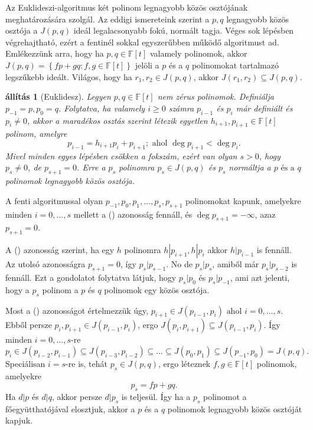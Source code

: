 \documentclass[9pt, showtrims]{memoir}
\makeatletter
\renewenvironment{proof}[1][\proofname]
    {\par\pushQED{\qed}%
    \normalfont \topsep6\p@\@plus6\p@\relax
    \trivlist
    \item[\hskip\labelsep
        \itshape
    #1\@addpunct{:}]\ignorespaces}
    {\popQED\endtrivlist\@endpefalse}
\theoremstyle{plain}
\newtheorem{proposition}{állítás}[section]
\theoremstyle{remark}
\theoremstyle{definition}
\renewcommand{\mathbf}{\mathbb}
\makeatother
\begin{document}
Az Euklideszi-algoritmus két polinom legnagyobb közös osztójának meghatározására szolgál.
Az eddigi ismereteink szerint a $p,q$ legnagyobb közös osztója a $J\left( p,q \right)$ ideál legalacsonyabb 
fokú, normált tagja. 
Véges sok lépésben végrehajtható, ezért a fentinél sokkal egyszerűbben működő algoritmust ad.
Emlékezzünk arra, hogy ha $p,q\in\mathbf{F}\left[ t \right]$ valamely polinomok, akkor
    \(
        J\left( p,q \right)=\left\{ fp+gq:f,g\in\mathbf{F}\left[ t \right] \right\}
    \)
jelöli a $p$ és a $q$ polinomokat tartalmazó legszűkebb ideált.
Világos, hogy ha $r_1,r_2\in J\left( p,q \right)$, akkor 
$J\left( r_1,r_2 \right)\subseteq J\left( p,q \right)$.
\begin{proposition}[Euklidesz]
    Legyen $p,q\in\mathbb{F}\left[ t \right]$ nem zérus polinomok.
    Definiálja $p_{-1}=p,p_{0}=q$. 
    Folytatva, ha valamely $i\geq 0$ számra $p_{i-1}$ és $p_i$ már definiált és $p_i\neq 0$, 
    akkor a maradékos osztás szerint létezik egyetlen $h_{i+1},p_{i+1}\in\mathbb{F}\left[ t \right]$ polinom,
    amelyre 
    \[
        p_{i-1}=h_{i+1}p_i+p_{i+1};
        \text{ ahol }
        \deg p_{i+1}<\deg p_i.\tag{\dag}
    \]
    Mivel minden egyes lépésben csökken a fokszám,
    ezért van olyan $s>0$, hogy $p_s\neq 0$, de $p_{s+1}=0$.
    Erre a $p_s$ polinomra $p_s\in J\left( p,q \right)$ és
    $p_s$ normáltja a $p\text{ és a }q$ polinomok legnagyobb közös osztója.
\end{proposition}
\begin{proof}
    A fenti algoritmussal olyan
    $p_{-1}, p_0,p_1,\dots,p_s,p_{s+1}$ polinomokat kapunk, 
    amelyekre minden $i=0,\dots,s$ mellett a (\dag) azonosság fennáll, 
    és $\deg p_{s+1}=-\infty$, 
    azaz $p_{s+1}=0$.

    A (\dag) azonosság szerint, 
    ha egy $h$ polinomra $h|p_{i+1},h|p_{i}$ akkor $h|p_{i-1}$ is fennáll.
    Az utolsó azonosságra $p_{s+1}=0$, 
    így $p_s|p_{s-1}$.
    No de $p_s|p_s$, amiből már $p_s|p_{s-2}$ is fennáll.
    Ezt a gondolatot folytatva látjuk, hogy $p_s|p_0$ és $p_s|p_{-1}$,
    ami azt jelenti, hogy a $p_s$ polinom a $p$ és $q$ polinomok egy közös osztója.

    Most a (\dag) azonosságot értelmezzük úgy, 
    \(
    p_{i+1}\in J\left( p_{i-1},p_i \right)\text{ ahol } i=0,\dots,s.
    \)
    Ebből persze $p_i,p_{i+1}\in J\left( p_{i-1},p_i \right)$, 
    ergo $J\left( p_i,p_{i+1} \right)\subseteq J\left( p_{i-1},p_i \right)$.
    Így minden $i=0,\dots,s$-re
    \[
        p_i\in J\left( p_{i-2},p_{i-1} \right)
        \subseteq
        J\left( p_{i-3},p_{i-2} \right)
        \subseteq
        \dots
        \subseteq
        J\left( p_0,p_1 \right)
        \subseteq
        J\left( p_{-1},p_0 \right)
        =
        J\left( p,q \right).
    \]
    Speciálisan $i=s$-re is, tehát $p_s\in J\left( p,q \right)$,
    ergo léteznek $f,g\in\mathbf{F}\left[ t \right]$ polinomok, 
    amelyekre 
    \[
        p_s=fp+gq.
    \]
    Ha $d|p$ és $d|q$, akkor persze $d|p_s$ is teljesül.
    Így ha a $p_s$ polinomot a főegyütthatójával elosztjuk,
    akkor a $p$ és a $q$ polinomok legnagyobb közös osztóját kapjuk.
\end{proof}
\end{document}

